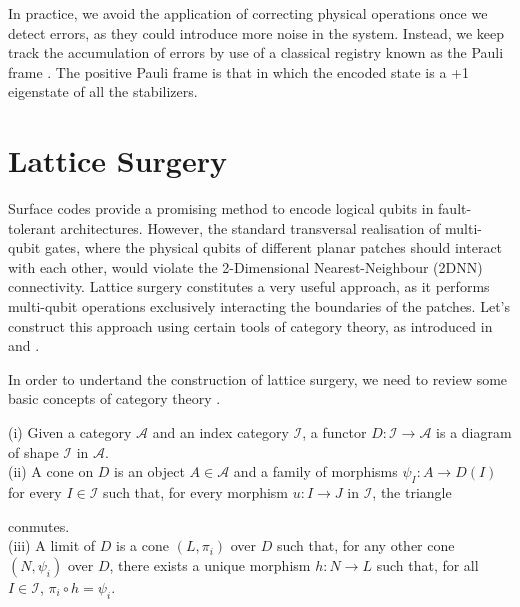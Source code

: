 \documentclass[12pt, twoside, openany]{book}
\begin{document}
In practice, we avoid the application of correcting physical operations once we detect errors, as they could introduce more noise in the system. Instead, we keep track the accumulation of errors by use of a classical registry known as the Pauli frame \cite{deBeaudrap2020}. The positive Pauli frame is that in which the encoded state is a +1 eigenstate of all the stabilizers.

\chapter{Lattice Surgery}

Surface codes provide a promising method to encode logical qubits in fault-tolerant architectures. However, the standard transversal realisation of multi-qubit gates, where the physical qubits of different planar patches should interact with each other, would violate the 2-Dimensional Nearest-Neighbour (2DNN) connectivity. Lattice surgery constitutes a very useful approach, as it performs multi-qubit operations exclusively interacting the boundaries of the patches. Let's construct this approach using certain tools of category theory, as introduced in \cite{Cowtan_2024} and \cite{cowtan2025fastfaulttolerantlogicalmeasurements}. 

In order to undertand the construction of lattice surgery, we need to review some basic concepts of category theory \cite{cowtan2025homologyhopfalgebrasquantum}.

\begin{definition} \label{cone_limit}
    (i) Given a category $\mathcal{A}$ and an index category $\mathcal{I}$, a functor $D: \mathcal{I} \rightarrow \mathcal{A}$ is a diagram of shape $\mathcal{I}$ in $\mathcal{A}$. \\
    (ii) A cone on $D$ is an object $A \in \mathcal {A}$ and a family of morphisms $\psi _I : A \rightarrow D(I)$ for every $I \in \mathcal{I}$ such that, for every morphism $u: I \rightarrow J$ in $\mathcal{I}$, the triangle \\
    \begin{center}
    \end{center}
    conmutes. \\
    (iii) A limit of $D$ is a cone $(L, \pi_i)$ over $D$ such that, for any other cone $(N, \psi_i)$ over $D$, there exists a unique morphism $h: N \rightarrow L$ such that, for all $I \in \mathcal{I}$, $\pi_i \circ h = \psi_i$. \\
\end{definition}
\end{document}
